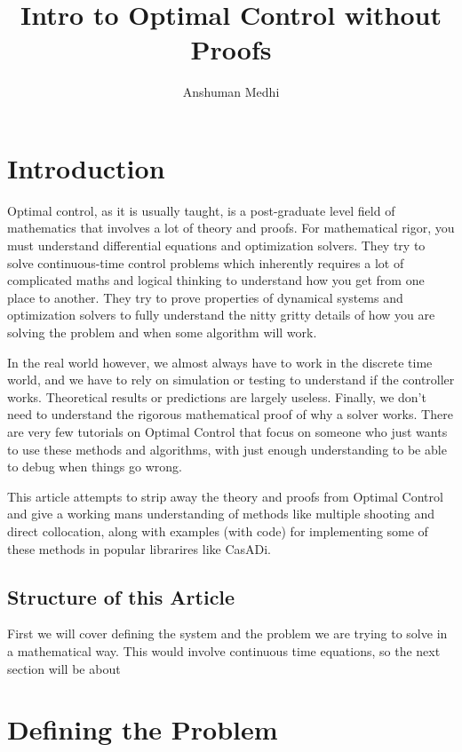\documentclass[a4paper, 10pt, twocolumn]{article}
\title{Intro to Optimal Control without Proofs}
\author{Anshuman Medhi}
\begin{document}
\maketitle
\tableofcontents

\section{Introduction}

Optimal control, as it is usually taught, is a post-graduate level field of mathematics that involves a lot of theory and proofs.
For mathematical rigor, you must understand differential equations and optimization solvers.
They try to solve continuous-time control problems which inherently requires a lot of complicated maths and logical thinking to understand how you get from one place to another.
They try to prove properties of dynamical systems and optimization solvers to fully understand the nitty gritty details of how you are solving the problem and when some algorithm will work.

In the real world however, we almost always have to work in the discrete time world, and we have to rely on simulation or testing to understand if the controller works.
Theoretical results or predictions are largely useless.
Finally, we don't need to understand the rigorous mathematical proof of why a solver works.
There are very few tutorials on Optimal Control that focus on someone who just wants to use these methods and algorithms, with just enough understanding to be able to debug when things go wrong.

This article attempts to strip away the theory and proofs from Optimal Control and give a working mans understanding of methods like multiple shooting and direct collocation, along with examples (with code) for implementing some of these methods in popular librarires like CasADi.

\subsection{Structure of this Article}

First we will cover defining the system and the problem we are trying to solve in a mathematical way. This would involve continuous time equations, so the next section will be about

\section{Defining the Problem}
\end{document}
